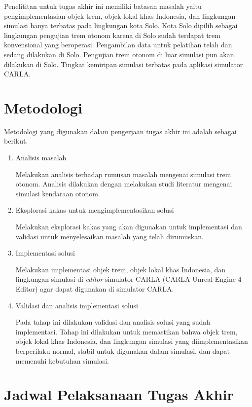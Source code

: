 Penelititan untuk tugas akhir ini memiliki batasan masalah yaitu
pengimplementasian objek trem, objek lokal khas Indonesia, dan lingkungan
simulasi hanya terbatas pada lingkungan kota Solo. Kota Solo dipilih sebagai
lingkungan pengujian trem otonom karena di Solo sudah terdapat trem konvensional
yang beroperasi. Pengambilan data untuk pelatihan telah dan sedang dilakukan di
Solo. Pengujian trem otonom di luar simulasi pun akan dilakukan di Solo.
Tingkat kemiripan simulasi terbatas pada aplikasi simulator CARLA.

\section{Metodologi}

Metodologi yang digunakan dalam pengerjaan tugas akhir ini adalah sebagai
berikut.

\begin{enumerate}
	\item Analisis masalah

	Melakukan analisis terhadap rumusan masalah mengenai simulasi trem otonom.
	Analisis dilakukan dengan melakukan studi literatur mengenai simulasi
	kendaraan otonom.

	\item Eksplorasi kakas untuk mengimplementasikan solusi

	Melakukan eksplorasi kakas yang akan digunakan untuk implementasi dan
	validasi untuk menyelesaikan masalah yang telah dirumuskan.

	\item Implementasi solusi

	Melakukan implementasi objek trem, objek lokal khas Indonesia, dan
	lingkungan simulasi di \textit{editor} simulator CARLA (CARLA Unreal Engine
	4 Editor) agar dapat digunakan di simulator CARLA.

	\item Validasi dan analisis implementasi solusi

	Pada tahap ini dilakukan validasi dan analisis solusi yang sudah
	implementasi. Tahap ini dilakukan untuk memastikan bahwa objek trem, objek
	lokal khas Indonesia, dan lingkungan simulasi yang diimplementasikan
	berperilaku normal, stabil untuk digunakan dalam simulasi, dan dapat
	memenuhi kebutuhan simulasi.

\end{enumerate}

\section{Jadwal Pelaksanaan Tugas Akhir}

